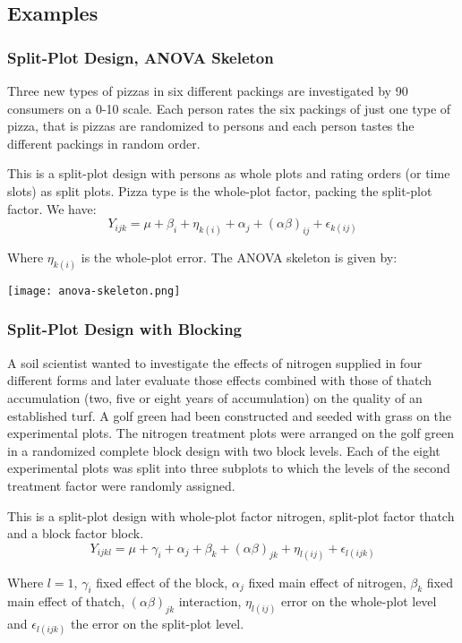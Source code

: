 \subsection{Examples}

\subsubsection{Split-Plot Design, ANOVA Skeleton}

Three new types of pizzas in six different packings are investigated by 90 consumers on a 0-10 scale. Each person rates the six packings of just one type of pizza, that is pizzas are randomized to persons and each person tastes the different packings in random order. \medskip

This is a split-plot design with persons as whole plots and rating orders (or time slots) as split plots. Pizza type is the whole-plot factor, packing the split-plot factor. We have:
$$Y_{ijk} = \mu + \beta_i + \eta_{k(i)} + \alpha_j + (\alpha \beta)_{ij} + \epsilon_{k(ij)}$$

Where $\eta_{k(i)}$ is the whole-plot error. The ANOVA skeleton is given by:
\begin{center}
	\texttt{[image: anova-skeleton.png]}
\end{center}

\subsubsection{Split-Plot Design with Blocking}

A soil scientist wanted to investigate the effects of nitrogen supplied in four different forms and later evaluate those effects combined with those of thatch accumulation (two, five or eight years of accumulation) on the quality of an established turf. A golf green had been constructed and seeded with grass on the experimental plots. The nitrogen treatment plots were arranged on the golf green in a randomized complete block design with two block levels. Each of the eight experimental plots was split into three subplots to which the levels of the second treatment factor were randomly assigned. \medskip

This is a split-plot design with whole-plot factor nitrogen, split-plot factor thatch and a block factor block.
$$Y_{ijkl} = \mu + \gamma_i + \alpha_j + \beta_k + (\alpha \beta)_{jk} + \eta_{l(ij)} + \epsilon_{l(ijk)}$$

Where $l = 1$, $\gamma_i$ fixed effect of the block, $\alpha_j$ fixed main effect of nitrogen, $\beta_k$ fixed main effect of thatch, $(\alpha \beta)_{jk}$ interaction, $\eta_{l(ij)}$ error on the whole-plot level and $\epsilon_{l(ijk)}$ the error on the split-plot level.

